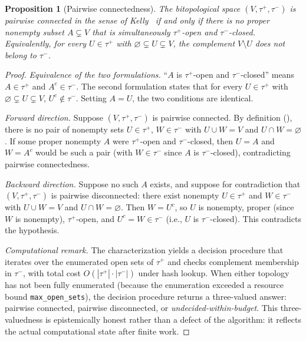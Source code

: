 \documentclass[11pt,a4paper]{article}
\theoremstyle{plain}
\newtheorem{proposition}[theorem]{Proposition}
\theoremstyle{definition}
\newcommand{\taufwd}{\tau^{+}}
\newcommand{\taubwd}{\tau^{-}}
\begin{document}

\begin{proposition}[Pairwise connectedness]%
\label{prop:pairwise-connected}
The bitopological space $(V, \taufwd, \taubwd)$ is pairwise connected in the
sense of Kelly~\cite{Kelly1963} if and only if there is no proper nonempty
subset $A \subsetneq V$ that is simultaneously $\taufwd$-open and
$\taubwd$-closed.  Equivalently, for every $U \in \taufwd$ with
$\varnothing \subsetneq U \subsetneq V$, the complement $V \setminus U$ does
not belong to $\taubwd$.
\end{proposition}

\begin{proof}
\emph{Equivalence of the two formulations.}  ``$A$ is $\taufwd$-open and
$\taubwd$-closed'' means $A \in \taufwd$ and $A^c \in \taubwd$.  The second
formulation states that for every $U \in \taufwd$ with
$\varnothing \subsetneq U \subsetneq V$, $U^c \notin \taubwd$.  Setting
$A = U$, the two conditions are identical.

\emph{Forward direction.}  Suppose $(V, \taufwd, \taubwd)$ is pairwise
connected.  By definition (), there is no pair
of nonempty sets $U \in \taufwd$, $W \in \taubwd$ with $U \cup W = V$ and
$U \cap W = \varnothing$.  If some proper nonempty $A$ were $\taufwd$-open
and $\taubwd$-closed, then $U = A$ and $W = A^c$ would be such a pair (with
$W \in \taubwd$ since $A$ is $\taubwd$-closed), contradicting pairwise
connectedness.

\emph{Backward direction.}  Suppose no such $A$ exists, and suppose for
contradiction that $(V, \taufwd, \taubwd)$ is pairwise disconnected: there
exist nonempty $U \in \taufwd$ and $W \in \taubwd$ with $U \cup W = V$ and
$U \cap W = \varnothing$.  Then $W = U^c$, so $U$ is nonempty, proper (since
$W$ is nonempty), $\taufwd$-open, and $U^c = W \in \taubwd$ (i.e., $U$ is
$\taubwd$-closed).  This contradicts the hypothesis.

\medskip
\noindent
\emph{Computational remark.}  The characterization yields a decision procedure
that iterates over the enumerated open sets of $\taufwd$ and checks complement
membership in $\taubwd$, with total cost $O(|\taufwd| \cdot |\taubwd|)$ under
hash lookup.  When either topology has not been fully enumerated (because the
enumeration exceeded a resource bound \texttt{max\_open\_sets}), the decision
procedure returns a three-valued answer: pairwise connected, pairwise
disconnected, or \emph{undecided-within-budget}.  This three-valuedness is
epistemically honest rather than a defect of the algorithm: it reflects the
actual computational state after finite work.
\end{proof}
\end{document}
